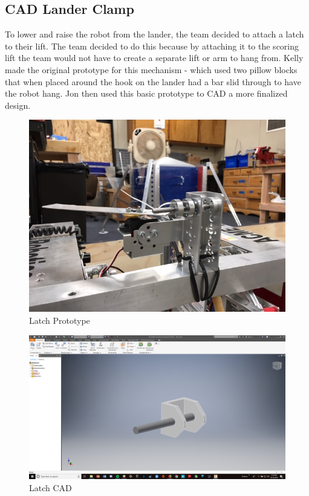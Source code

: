 \documentclass{article}
\begin{document}
\subsection{CAD Lander Clamp}
To lower and raise the robot from the lander, the team decided to attach a latch to their lift. The team decided to do this because by attaching it to the scoring lift the team would not have to create a separate lift or arm to hang from. Kelly made the original prototype for this mechanism - which used two pillow blocks that when placed around the hook on the lander had a bar slid through to have the robot hang. Jon then used this basic prototype to CAD a more finalized design.

\begin{figure}
    \centering
    \includegraphics[width=.6 \textwidth]{06_10-08/images/latch1.JPG}
    \caption{Latch Prototype}
    \label{fig: Latch CAD1}
\end{figure}

\begin{figure}
    \centering
    \includegraphics[width=.6 \textwidth]{06_10-08/images/latch.png}
    \caption{Latch CAD}
    \label{fig: Latch CAD2}
\end{figure}
\end{document}
